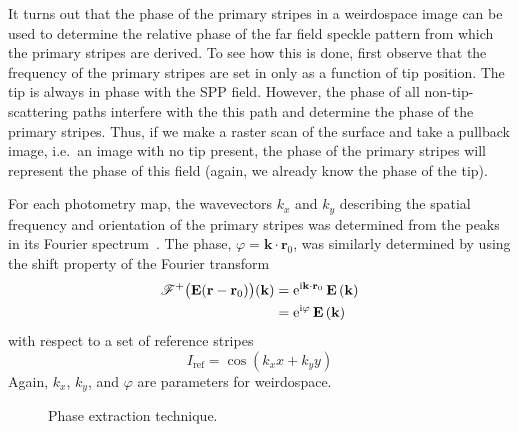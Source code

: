 It turns out that the phase of the primary stripes in a weirdospace image
can be used to determine the relative phase of the far field speckle
pattern from which the primary stripes are derived.  To see how this is
done, first observe that the frequency of the primary stripes are set in
 only as a function of tip position.  The tip
is always in phase with the SPP field.  However, the phase of all
non-tip-scattering paths interfere with the this path and determine the
phase of the primary stripes.  Thus, if we make a raster scan of the
surface and take a pullback image, i.e.\ an image with no tip present, the
phase of the primary stripes will represent the phase of this field (again,
we already know the phase of the tip).

For each photometry map, the wavevectors $k_x$ and $k_y$ describing the
spatial frequency and orientation of the primary stripes was determined
from the peaks in its Fourier spectrum~\cite{huntley1986speckle}.  The
phase, $\varphi=\mathbf{k}\cdot\mathbf{r}_0$, was similarly determined
by using the shift property of the Fourier transform
\begin{align}
{\mathscr{F}^{+}\bigl(\mathbf{E}(\mathbf{r}-\mathbf{r}_0)\bigr)}(\mathbf{k}) &= 
{\mathrm{e}}^{{\mathrm{i}} \mathbf{k}\cdot \mathbf{r}_0}\,
\mathbf{E}\left(\mathbf{k}\right)\\
&= {\mathrm{e}}^{{\mathrm{i}} \varphi}\, \mathbf{E}\left(\mathbf{k}\right)
\end{align}
with respect to a set of reference stripes
\begin{equation}
I_\mathrm{ref} = \cos(k_x x + k_y y)
\end{equation}
Again, $k_x$, $k_y$, and $\varphi$ are parameters for weirdospace.


\begin{figure}
\centering
\caption{Phase extraction technique.}
\label{fig:phaseextractiontechnique}
\end{figure}

